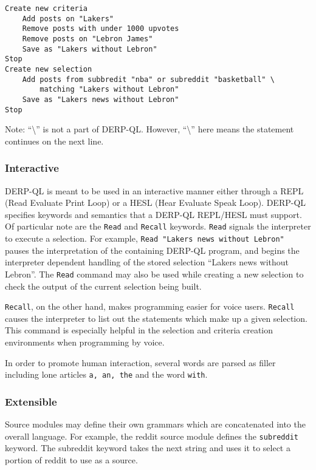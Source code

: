 \begin{lstlisting}
Create new criteria
    Add posts on "Lakers"
    Remove posts with under 1000 upvotes
    Remove posts on "Lebron James"
    Save as "Lakers without Lebron"
Stop
Create new selection
    Add posts from subbredit "nba" or subreddit "basketball" \ 
        matching "Lakers without Lebron"
    Save as "Lakers news without Lebron"
Stop
\end{lstlisting}
Note: ``\textbackslash'' is not a part of DERP-QL. However, ``\textbackslash'' here means the statement continues on the next line.

\subsubsection{Interactive}
DERP-QL is meant to be used in an interactive manner either through a REPL (Read Evaluate Print Loop) or a HESL (Hear Evaluate Speak Loop). DERP-QL specifies keywords and semantics that a DERP-QL REPL/HESL must support. Of particular note are the \texttt{Read} and \texttt{Recall} keywords. \texttt{Read} signals the interpreter to execute a selection. For example, \texttt{Read "Lakers news without Lebron"} pauses the interpretation of the containing DERP-QL program, and begins the interpreter dependent handling of the stored selection ``Lakers news without Lebron''. The \texttt{Read} command may also be used while creating a new selection to check the output of the current selection being built.

\texttt{Recall}, on the other hand, makes programming easier for voice users. \texttt{Recall} causes the interpreter to list out the statements which make up a given selection. This command is especially helpful in the selection and criteria creation environments when programming by voice. 

In order to promote human interaction, several words are parsed as filler including lone articles \texttt{a, an, the} and the word \texttt{with}.

\subsubsection{Extensible}\label{sssec:Extensible}
Source modules may define their own grammars which are concatenated into the overall language. For example, the reddit source module defines the \texttt{subreddit} keyword. The subreddit keyword takes the next string and uses it to select a portion of reddit to use as a source.

